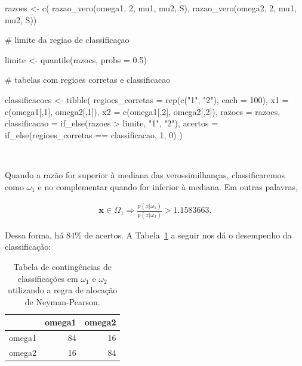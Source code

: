 \documentclass[
  a4paperpaper,
]{article}
\newenvironment{Shaded}{\begin{snugshade}}{\end{snugshade}}
\newcommand{\AttributeTok}[1]{\textcolor[rgb]{0.40,0.45,0.13}{#1}}
\newcommand{\CommentTok}[1]{\textcolor[rgb]{0.37,0.37,0.37}{#1}}
\newcommand{\DecValTok}[1]{\textcolor[rgb]{0.68,0.00,0.00}{#1}}
\newcommand{\FloatTok}[1]{\textcolor[rgb]{0.68,0.00,0.00}{#1}}
\newcommand{\FunctionTok}[1]{\textcolor[rgb]{0.28,0.35,0.67}{#1}}
\newcommand{\NormalTok}[1]{\textcolor[rgb]{0.00,0.23,0.31}{#1}}
\newcommand{\OtherTok}[1]{\textcolor[rgb]{0.00,0.23,0.31}{#1}}
\newcommand{\SpecialCharTok}[1]{\textcolor[rgb]{0.37,0.37,0.37}{#1}}
\newcommand{\StringTok}[1]{\textcolor[rgb]{0.13,0.47,0.30}{#1}}
\begin{document}
\begin{Shaded}
\begin{Highlighting}[]
\NormalTok{razoes }\OtherTok{\textless{}{-}} \FunctionTok{c}\NormalTok{(}
  \FunctionTok{razao\_vero}\NormalTok{(omega1, }\DecValTok{2}\NormalTok{, mu1, mu2, S),}
  \FunctionTok{razao\_vero}\NormalTok{(omega2, }\DecValTok{2}\NormalTok{, mu1, mu2, S))}
                             
\CommentTok{\# limite da regiao de classificaçao}

\NormalTok{limite }\OtherTok{\textless{}{-}} \FunctionTok{quantile}\NormalTok{(razoes, }\AttributeTok{probs =} \FloatTok{0.5}\NormalTok{)}

\CommentTok{\# tabelas com regioes corretas e classificacao}

\NormalTok{classificacoes }\OtherTok{\textless{}{-}} \FunctionTok{tibble}\NormalTok{(}
  \AttributeTok{regioes\_corretas =} \FunctionTok{rep}\NormalTok{(}\FunctionTok{c}\NormalTok{(}\StringTok{"1"}\NormalTok{, }\StringTok{"2"}\NormalTok{), }\AttributeTok{each =} \DecValTok{100}\NormalTok{),}
  \AttributeTok{x1 =} \FunctionTok{c}\NormalTok{(omega1[,}\DecValTok{1}\NormalTok{], omega2[,}\DecValTok{1}\NormalTok{]),}
  \AttributeTok{x2 =} \FunctionTok{c}\NormalTok{(omega1[,}\DecValTok{2}\NormalTok{], omega2[,}\DecValTok{2}\NormalTok{]),}
  \AttributeTok{razoes =}\NormalTok{ razoes,}
  \AttributeTok{classificacao =} \FunctionTok{if\_else}\NormalTok{(razoes }\SpecialCharTok{\textgreater{}}\NormalTok{ limite, }\StringTok{"1"}\NormalTok{, }\StringTok{"2"}\NormalTok{),}
  \AttributeTok{acertos =} \FunctionTok{if\_else}\NormalTok{(regioes\_corretas }\SpecialCharTok{==}\NormalTok{ classificacao, }\DecValTok{1}\NormalTok{, }\DecValTok{0}\NormalTok{)}
\NormalTok{)}
\end{Highlighting}
\end{Shaded}

~

Quando a razão for superior à mediana das verossimilhanças,
classificaremos como \(\omega_1\) e no complementar quando for inferior
à mediana. Em outras palavras,

\begin{align}
  \boldsymbol{x} \in \Omega_1 \Rightarrow \frac{p(x| \omega_1)}{p(x| \omega_2)} > 1.1583663.
\end{align}

Dessa forma, há 84\% de acertos. A Tabela~\ref{tbl-acertosvero} a seguir
nos dá o desempenho da classificação:

\begin{longtable}[]{@{}lrr@{}}

\caption{\label{tbl-acertosvero}Tabela de contingências de
classificações em \(\omega_1\) e \(\omega_2\) utilizando a regra de
alocação de Neyman-Pearson.}

\tabularnewline

\toprule\noalign{}
& omega1 & omega2 \\
\midrule\noalign{}
\endhead
\bottomrule\noalign{}
\endlastfoot
omega1 & 84 & 16 \\
omega2 & 16 & 84 \\

\end{longtable}
\end{document}
